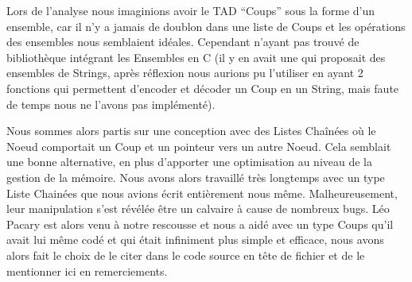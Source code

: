 \hspace{3em}Lors de l’analyse nous imaginions avoir le TAD “Coups” sous la forme d’un ensemble, car il n’y a jamais de doublon dans une liste de Coups et les opérations des ensembles nous semblaient idéales. Cependant n'ayant pas trouvé de bibliothèque intégrant les Ensembles en C (il y en avait une qui proposait des ensembles de Strings, après réflexion nous aurions pu l’utiliser en ayant 2 fonctions qui permettent d’encoder et décoder un Coup en un String, mais faute de temps nous ne l’avons pas implémenté). 

Nous sommes alors partis sur une conception avec des Listes Chaînées où le Noeud comportait un Coup et un pointeur vers un autre Noeud. Cela semblait une bonne alternative, en plus d’apporter une optimisation au niveau de la gestion de la mémoire. Nous avons alors travaillé très longtemps avec un type Liste Chainées que nous avions écrit entièrement nous même. Malheureusement, leur manipulation s’est révélée être un calvaire à cause de nombreux bugs. Léo Pacary est alors venu à notre rescousse et nous a aidé avec un type Coups qu’il avait lui même codé et qui était infiniment plus simple et efficace, nous avons alors fait le choix de le citer dans le code source en tête de fichier et de le mentionner ici en remerciements.
